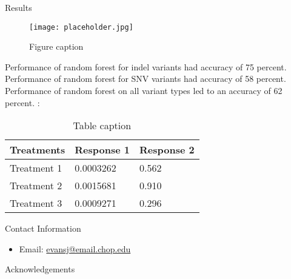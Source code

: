 \begin{block}{Results}

\begin{figure}
\texttt{[image: placeholder.jpg]}
\caption{Figure caption}
\end{figure}

Performance of random forest for indel variants had accuracy of 75 percent.
Performance of random forest for SNV variants had accuracy of 58 percent.
Performance of random forest on all variant types led to an accuracy of 62 percent.
:

\begin{table}
\vspace{2ex}
\begin{tabular}{l l l}
\toprule
\textbf{Treatments} & \textbf{Response 1} & \textbf{Response 2}\\
\midrule
Treatment 1 & 0.0003262 & 0.562 \\
Treatment 2 & 0.0015681 & 0.910 \\
Treatment 3 & 0.0009271 & 0.296 \\
\bottomrule
\end{tabular}
\caption{Table caption}
\end{table}

\end{block}

\begin{alertblock}{Contact Information}

\begin{itemize}
\item Email: \href{mailto:john@smith.com}{evansj@email.chop.edu}
\end{itemize}

\end{alertblock}
\begin{block}{Acknowledgements}

\small{} \\

\end{block}




